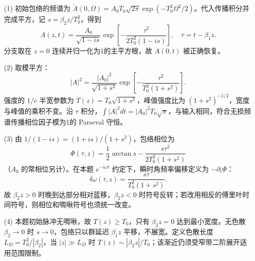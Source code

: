 (1) 初始包络的频谱为 \(\tilde A(0,\Omega)=A_0T_0\sqrt{2\pi}\exp(-T_0^2\Omega^2/2)\)。代入传播积分并完成平方，记 \(s=\beta_2z/T_0^2\)，得到
\[
A(z,t)=\frac{A_0}{\sqrt{1-is}}\exp\left[-\frac{\tau^2}{2T_0^2(1-is)}\right],\quad \tau=t-\beta_1z.
\]
分支取在 \(z=0\) 连续并归一化为1的主平方根，故 \(A(0,t)\) 被正确恢复。

(2) 取模平方：
\[
|A|^2=\frac{|A_0|^2}{\sqrt{1+s^2}}\exp\left[-\frac{\tau^2}{T_0^2(1+s^2)}\right].
\]
强度的 \(1/e\) 半宽参数为 \(T(z)=T_0\sqrt{1+s^2}\)，峰值强度比为 \((1+s^2)^{-1/2}\)，宽度与峰值的乘积不变。沿 \(\tau\) 积分，\(\int|A|^2dt=|A_0|^2T_0\sqrt\pi\)，与输入相同，符合无损频谱传播相位因子模为1的 Parseval 守恒。

(3) 由 \(1/(1-is)=(1+is)/(1+s^2)\)，包络相位为
\[
\Phi(\tau,z)=\frac12\arctan s-\frac{s\tau^2}{2T_0^2(1+s^2)}
\]
（\(A_0\) 的常相位另计）。在本题 \(e^{-i\omega t}\) 约定下，瞬时角频率偏移定义为 \(-\partial_t\Phi\)：
\[
\delta\omega(\tau,z)=\frac{s\tau}{T_0^2(1+s^2)}.
\]
故 \(\beta_2z>0\) 时晚到达部分相对蓝移，\(\beta_2z<0\) 时符号反转；若改用相反的傅里叶时间符号，则相位和啁啾符号也须统一改变。

(4) 本题初始脉冲无啁啾，故 \(T(z)\ge T_0\)，只有 \(\beta_2z=0\) 达到最小宽度。无色散 \(\beta_2\to0\) 时 \(s\to0\)，包络只以群延迟 \(\beta_1z\) 平移，不展宽。定义色散长度 \(L_D=T_0^2/|\beta_2|\)，当 \(|z|\gg L_D\) 时 \(T(z)\sim |\beta_2 z|/T_0\)；该渐近仍须受窄带二阶展开适用范围限制。
